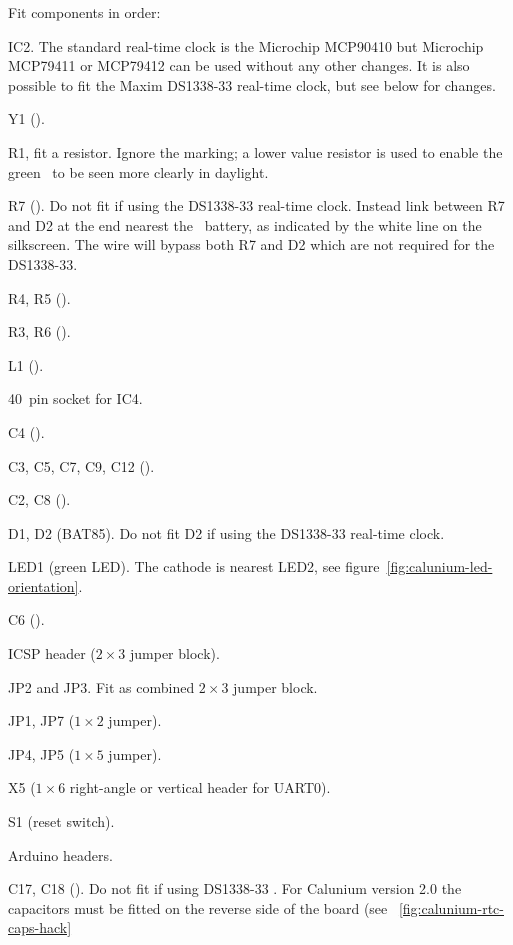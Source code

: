 Fit components in order:
\begin{buildorder}
\item IC2. The standard real-time clock is the Microchip MCP90410 but
  Microchip MCP79411 or MCP79412 can be used without any other
  changes.
  It is also possible to fit the Maxim DS1338-33 real-time clock,
  but see below for changes.
\item Y1 ().
\item R1, fit a  resistor. Ignore the  marking; a
  lower value resistor is used to enable the green \led\ to be seen
  more clearly in daylight.
\item R7 (). Do not fit if using the DS1338-33 real-time
  clock. Instead link between R7 and D2 at the end nearest the \rtc\
  battery, as indicated by the white line on the silkscreen. The wire
  will bypass both R7 and D2 which are not required for the DS1338-33.
\item R4, R5 (\kohm{4.7}).
\item R3, R6 ().
\item L1 ().
\item 40~pin socket for IC4.
\item C4 ().
\item C3, C5, C7, C9, C12 ().
\item C2, C8 ().
\item D1, D2 (BAT85). Do not fit D2 if using the DS1338-33 real-time clock.
\item LED1 (green LED). The cathode is nearest LED2, see
  figure~\ref{fig:calunium-led-orientation}.
\item C6 ().
\item ICSP header ($2 \times 3$ jumper block). %
\item JP2 and JP3. Fit as combined $2 \times 3$ jumper block.
\item JP1, JP7 ($1 \times 2$ jumper).
\item JP4, JP5 ($1 \times 5$ jumper).
\item X5 ($1 \times 6$ right-angle or vertical header for UART0).
\item S1 (reset switch).
\item Arduino headers. 
\item C17, C18 (). Do not fit if using DS1338-33 \rtc. For
  Calunium version 2.0 the capacitors must be fitted on the reverse
  side of the board (see \figurename~\ref{fig:calunium-rtc-caps-hack}

\end{buildorder}
